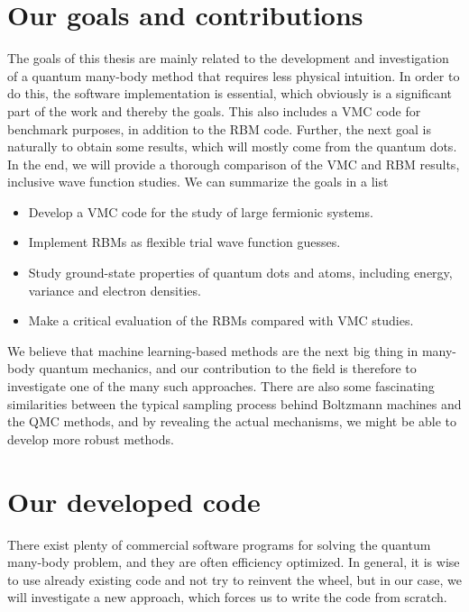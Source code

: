 \section{Our goals and contributions} \label{sec:goals}
The goals of this thesis are mainly related to the development and investigation of a quantum many-body method that requires less physical intuition. In order to do this, the software implementation is essential, which obviously is a significant part of the work and thereby the goals. This also includes a VMC code for benchmark purposes, in addition to the RBM code. Further, the next goal is naturally to obtain some results, which will mostly come from the quantum dots. In the end, we will provide a thorough comparison of the VMC and RBM results, inclusive wave function studies. We can summarize the goals in a list
\begin{itemize}
	\item Develop a VMC code for the study of large fermionic systems.
	\item Implement RBMs as flexible trial wave function guesses.
	\item Study ground-state properties of quantum dots and atoms, including energy, variance and electron densities.
	\item Make a critical evaluation of the RBMs compared with VMC studies.
\end{itemize}

We believe that machine learning-based methods are the next big thing in many-body quantum mechanics, and our contribution to the field is therefore to investigate one of the many such approaches. There are also some fascinating similarities between the typical sampling process behind Boltzmann machines and the QMC methods, and by revealing the actual mechanisms, we might be able to develop more robust methods. 

\section{Our developed code}
There exist plenty of commercial software programs for solving the quantum many-body problem, and they are often efficiency optimized. In general, it is wise to use already existing code and not try to reinvent the wheel, but in our case, we will investigate a new approach, which forces us to write the code from scratch. 

